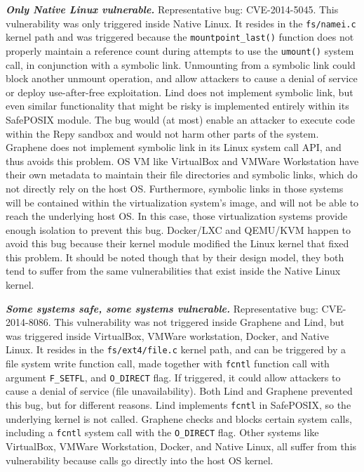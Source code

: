 {{{\emph{\textbf{Only Native Linux vulnerable.}}  Representative bug: CVE-2014-5045.
This vulnerability was only triggered inside Native Linux. It resides in the
\texttt{fs/namei.c} kernel path and was triggered because
the \texttt{mountpoint\_last()}
function does not properly
maintain a reference count during attempts to use the \texttt{umount()} system call,
in conjunction with a symbolic link. Unmounting from a symbolic link could block 
another unmount operation, and allow attackers to cause a denial of service or 
deploy use-after-free exploitation. Lind does not implement symbolic link, but 
even similar functionality that might be risky is implemented entirely
within its SafePOSIX module. The bug would (at most) enable an attacker to execute
code within the Repy sandbox and would not harm other parts of the system. 
Graphene does not implement symbolic link in its Linux system call API, and thus avoids 
this problem. 
OS VM like VirtualBox and VMWare Workstation have their own metadata to maintain their file
directories and symbolic links, which do not directly rely on the host OS. 
Furthermore, symbolic links in those systems will be contained within the virtualization system's image,
and will not be able to reach the underlying host OS. In this case, those virtualization systems provide enough
isolation to prevent this bug.
Docker/LXC and QEMU/KVM happen to avoid this bug because their kernel module modified the Linux kernel 
that fixed this problem. It should be noted though that by their design model, they both tend to suffer from 
the same vulnerabilities that exist inside the Native Linux kernel. 

\emph{\textbf{Some systems safe, some systems vulnerable.}}  Representative bug: CVE-2014-8086.
This vulnerability was not triggered inside Graphene and Lind, but was triggered inside
VirtualBox, VMWare workstation, Docker, and Native Linux. It resides in
the \texttt{fs/ext4/file.c} kernel path, and can be triggered by a file system write
function call, made together with \texttt{fcntl} function call
with argument \texttt{F\_SETFL}, and \texttt{O\_DIRECT} flag. If triggered, it could
allow attackers to cause a denial of service (file unavailability). Both Lind and
Graphene prevented this bug, but for different reasons. Lind
implements \texttt{fcntl} in SafePOSIX, so the underlying kernel is not called.
Graphene checks and blocks certain system calls, including
a \texttt{fcntl} system call with the \texttt{O\_DIRECT} flag.
Other systems like VirtualBox, VMWare Workstation, Docker, and Native Linux,
all suffer from this vulnerability because calls go directly into the host OS
kernel.

}}}
